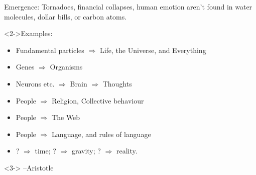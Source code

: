 \begin{frame}

  \begin{block}{Emergence:}
    Tornadoes, financial collapses, human emotion aren't
    found in water molecules, dollar bills, or carbon atoms.
  \end{block}

  \begin{block}<2->{Examples:}
    \begin{itemize}
    \item<2-> 
      Fundamental particles $\Rightarrow$ Life, the Universe, and Everything
    \item<2-> 
      Genes $\Rightarrow$ Organisms
    \item<2->
      Neurons etc. $\Rightarrow$ Brain $\Rightarrow$ Thoughts
    \item<2-> 
      People $\Rightarrow$ Religion, Collective behaviour
    \item<2->
      People $\Rightarrow$ The Web
    \item<2->
      People $\Rightarrow$ Language, and rules of language
    \item<2->
      ? $\Rightarrow$ time; 
      ? $\Rightarrow$ gravity;
      ? $\Rightarrow$ reality.
    \end{itemize}
  \end{block}

  \begin{block}<3->{}
    --Aristotle
  \end{block}

\end{frame}


